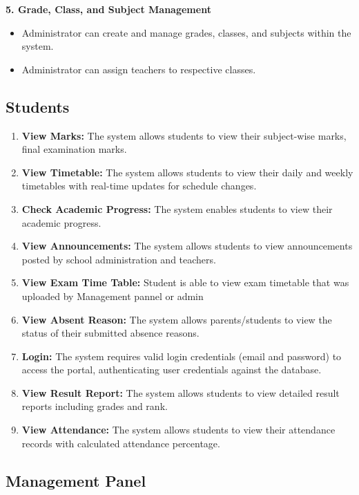 \documentclass[12pt, a4paper]{report}
\begin{document}
\textbf{5. Grade, Class, and Subject Management}
\begin{itemize}
    \item Administrator can create and manage grades, classes, and subjects within the system.
    \item Administrator can assign teachers to respective classes.
\end{itemize}


\subsection{Students}

\begin{enumerate}
    \item \textbf{View Marks:} The system allows students to view their subject-wise marks, final examination marks.
    \item \textbf{View Timetable:} The system allows students to view their daily and weekly timetables with real-time updates for schedule changes.
    \item \textbf{Check Academic Progress:} The system enables students to view their academic progress.
    \item \textbf{View Announcements:} The system allows students to view announcements posted by school administration and teachers.
    \item \textbf{View Exam Time Table:} Student is able to view exam timetable that was uploaded by Management pannel or admin
    \item \textbf{View Absent Reason:} The system allows parents/students to view the status of their submitted absence reasons.
    \item \textbf{Login:} The system requires valid login credentials (email and password) to access the portal, authenticating user credentials against the database.
    \item \textbf{View Result Report:} The system allows students to view detailed result reports including grades and rank.
    \item \textbf{View Attendance:} The system allows students to view their attendance records with calculated attendance percentage.
\end{enumerate}

\subsection{Management Panel}
\end{document}

